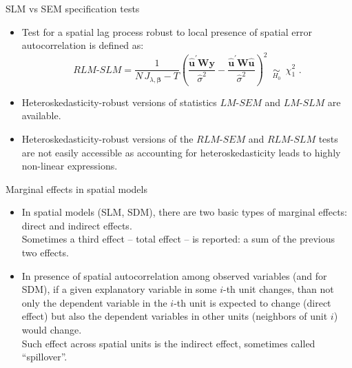 \documentclass{beamer}
\begin{document}
\begin{frame}{SLM vs SEM specification tests}
\begin{itemize}
    \item Test for a spatial lag process robust to local presence of spatial error autocorrelation is defined as:
    \begin{equation*}
    \textit{RLM-SLM}=\frac{1}{N \, J_{\lambda,\bm{\beta}} - T}
    \left(\frac{\bm{\hat{u}}^{'}\bm{Wy}}{\hat{\sigma}^2}
    - \frac{\bm{\hat{u}}^{'}\bm{W\hat{u}}}{\hat{\sigma}^2} \right)^{2} 
    \,\,\, \underset{H_0}{\sim} \,\,\, \chi_1^2 \,\,.
    \end{equation*}
    \item Heteroskedasticity-robust versions of statistics $\textit{LM-SEM}$ and $\textit{LM-SLM}$ are available. 
    \smallskip
    \item Heteroskedasticity-robust versions of the $\textit{RLM-SEM}$ and $\textit{RLM-SLM}$ tests are not easily accessible as accounting for heteroskedasticity leads to highly non-linear expressions.
\end{itemize}
\end{frame}
\begin{frame}{Marginal effects in spatial models}
\begin{itemize}
	\item In spatial models (SLM, SDM), there are two basic types of marginal effects: direct and indirect effects. \\ \bigskip 
	Sometimes a third effect -- total effect -- is reported: a sum of the previous two effects. 
	\bigskip
	\item In presence of spatial autocorrelation among observed variables (and for SDM), if a given explanatory variable in some $i$-th unit changes, than not only the dependent variable in the $i$-th unit is expected to change (direct effect) but also the dependent variables in other units (neighbors of unit $i$) would change. \\ \bigskip Such effect across spatial units is the indirect effect, sometimes called ``spillover''.
	\end{itemize}
\end{frame}
\end{document}
